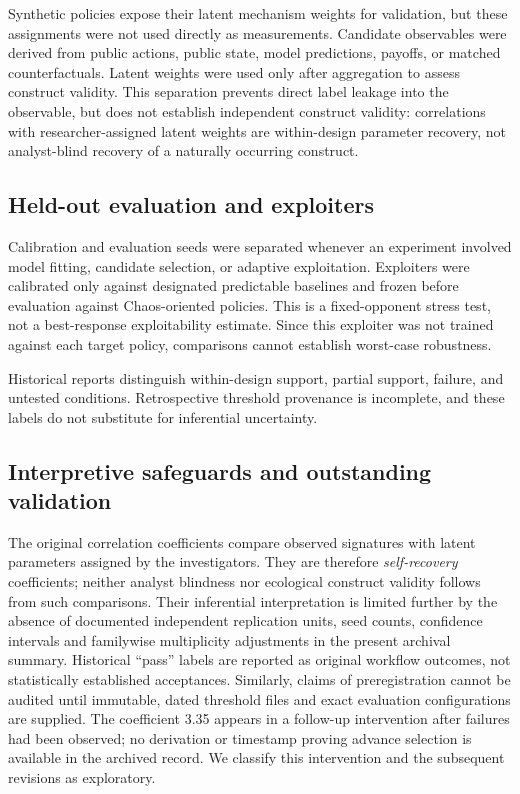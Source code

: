 \documentclass[journal]{IEEEtran}
\begin{document}
Synthetic policies expose their latent mechanism weights for validation, but these assignments were not used directly as measurements. Candidate observables were derived from public actions, public state, model predictions, payoffs, or matched counterfactuals. Latent weights were used only after aggregation to assess construct validity. This separation prevents direct label leakage into the observable, but does not establish independent construct validity: correlations with researcher-assigned latent weights are within-design parameter recovery, not analyst-blind recovery of a naturally occurring construct.

\subsection{Held-out evaluation and exploiters}

Calibration and evaluation seeds were separated whenever an experiment involved model fitting, candidate selection, or adaptive exploitation. Exploiters were calibrated only against designated predictable baselines and frozen before evaluation against Chaos-oriented policies. This is a fixed-opponent stress test, not a best-response exploitability estimate. Since this exploiter was not trained against each target policy, comparisons cannot establish worst-case robustness.

Historical reports distinguish within-design support, partial support, failure, and untested conditions. Retrospective threshold provenance is incomplete, and these labels do not substitute for inferential uncertainty.

\subsection{Interpretive safeguards and outstanding validation}
The original correlation coefficients compare observed signatures with latent parameters assigned by the investigators. They are therefore \emph{self-recovery} coefficients; neither analyst blindness nor ecological construct validity follows from such comparisons. Their inferential interpretation is limited further by the absence of documented independent replication units, seed counts, confidence intervals and familywise multiplicity adjustments in the present archival summary. Historical ``pass'' labels are reported as original workflow outcomes, not statistically established acceptances. Similarly, claims of preregistration cannot be audited until immutable, dated threshold files and exact evaluation configurations are supplied. The coefficient 3.35 appears in a follow-up intervention after failures had been observed; no derivation or timestamp proving advance selection is available in the archived record. We classify this intervention and the subsequent revisions as exploratory.
\end{document}
